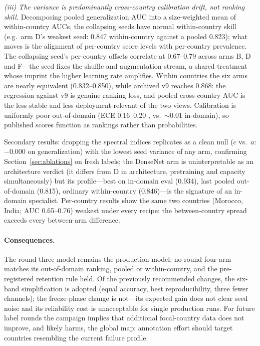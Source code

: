 \documentclass[11pt,a4paper]{article}
\begin{document}
\emph{(iii) The variance is predominantly cross-country calibration drift,
not ranking skill.} Decomposing pooled generalization AUC into a
size-weighted mean of within-country AUCs, the collapsing seeds have normal
within-country skill (e.g.\ arm D's weakest seed: 0.847 within-country
against a pooled 0.823); what moves is the alignment of per-country score
levels with per-country prevalence. The collapsing seed's per-country offsets
correlate at 0.67--0.79 across arms B, D and F---the seed fixes the shuffle
and augmentation stream, a shared treatment whose imprint the higher learning
rate amplifies. Within countries the six arms are nearly equivalent
(0.832--0.850), while archived v9 reaches 0.868: the regression against v9 is
genuine ranking loss, and pooled cross-country AUC is the less stable and less
deployment-relevant of the two views. Calibration is uniformly poor
out-of-domain (ECE 0.16--0.20 \citep{guo2017calibration}, vs.\ $\sim$0.01
in-domain), so published scores function as rankings rather than
probabilities.

Secondary results: dropping the spectral indices replicates as a clean null
($c$ vs.\ $a$: $-0.000$ on generalization) with the lowest seed variance of
any arm, confirming Section~\ref{sec:ablations} on fresh labels; the DenseNet
arm is uninterpretable as an architecture verdict (it differs from D in
architecture, pretraining and capacity simultaneously) but its
profile---best on in-domain eval (0.934), last pooled out-of-domain
(0.815), ordinary within-country (0.846)---is the signature of an in-domain
specialist. Per-country results show the same two countries (Morocco, India;
AUC 0.65--0.76) weakest under every recipe: the between-country spread
exceeds every between-arm difference.

\paragraph{Consequences.} The round-three model remains the production model:
no round-four arm matches its out-of-domain ranking, pooled or within-country,
and the pre-registered retention rule held. Of the previously recommended
changes, the six-band simplification is adopted (equal accuracy, best
reproducibility, three fewer channels); the freeze-phase change is not---its
expected gain does not clear seed noise and its reliability cost is
unacceptable for single production runs. For future label rounds the campaign
implies that additional focal-country data does not improve, and likely
harms, the global map; annotation effort should target countries resembling
the current failure profile.
\end{document}
